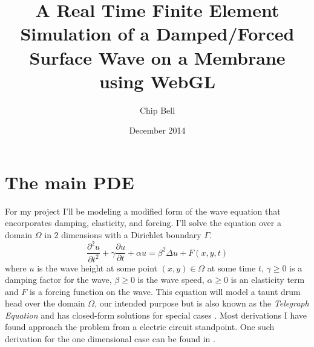 \documentclass[a4paper,12pt]{article}
\begin{document}
\newcommand{\innerproduct}[2]{\int\limits_{\Omega} #1 #2 d\Omega}
\newcommand{\innerproductdot}[2]{\int\limits_{\Omega} \nabla #1 \cdot \nabla #2 d\Omega}
\newcommand{\firstderivative}[2]{\frac{d #1}{d #2}}
\newcommand{\secondderivative}[2]{\frac{d^2 #1}{d #2^2}}
\newcommand{\firstpartial}[2]{\frac{\partial #1}{\partial #2}}
\newcommand{\secondpartial}[2]{\frac{\partial^2 #1}{\partial #2^2}}
\newcommand{\laplacian}[1]{\Delta #1}
\newcommand{\secondfinitediff}[1]{\frac{#1^{n+1} - 2#1^n + #1^{n-1}}{\delta t^2}}
\newcommand{\firstfinitediff}[1]{\frac{#1^{n+1} - #1^{n-1}}{2\delta t}}
\newcommand{\step}[1]{\left( \frac{1}{\delta t^2} #1 \frac{\gamma}{2\delta t} \right)}
\newcommand{\mat}[2][rrrrrr]{
    \left(\begin{array}{#1}
    #2 \\
    \end{array}
    \right)
}

\title{A Real Time Finite Element Simulation of a Damped/Forced Surface Wave on a Membrane using WebGL}
\author{Chip Bell}
\date{December 2014}
\maketitle



\section{The main PDE}
For my project I'll be modeling a modified form of the wave equation that encorporates damping, elasticity, and
forcing. I'll solve the equation over a domain $\Omega$ in 2 dimensions with a Dirichlet boundary $\Gamma$. 
\begin{equation} \label{eq:main_pde}
\secondpartial{u}{t} + \gamma \firstpartial{u}{t} + \alpha u
=
\beta^2 \laplacian{u} + F(x,y,t)
\end{equation}
where $u$ is the wave height at some point $(x,y) \in \Omega$ at some time $t$, $\gamma \ge 0$ is a damping factor for the wave,
$\beta \ge 0$ is the wave speed, $\alpha \ge 0$ is an elasticity term and $F$ is a forcing function on the wave. This equation
will model a taunt drum head over the domain $\Omega$, our intended purpose but is also known as the
\emph{Telegraph Equation} and has closed-form solutions for special cases \cite{pde_solution}. Most derivations I have found
approach
the problem from a electric circuit standpoint. One such derivation for the one dimensional case can be found in
\cite{pde_derivation}.







\end{document}
